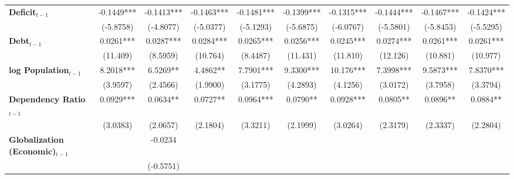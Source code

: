 \begin{center}
\begin{tabular}{lccccccccc}
\textbf{Deficit$_{t-1}$}             &     -0.1449***     &     -0.1413***     &     -0.1463***     &     -0.1481***     &     -0.1399***     &     -0.1315***     &     -0.1444***     &     -0.1467***     &     -0.1424***      \\
\textbf{ }                         &     (-5.8758)      &     (-4.8077)      &     (-5.0377)      &     (-5.1293)      &     (-5.6875)      &     (-6.0767)      &     (-5.5801)      &     (-5.8453)      &     (-5.5295)       \\
\textbf{Debt$_{t-1}$}                &     0.0261***      &     0.0287***      &     0.0284***      &     0.0265***      &     0.0256***      &     0.0245***      &     0.0274***      &     0.0261***      &     0.0261***       \\
\textbf{ }                         &      (11.409)      &      (8.5959)      &      (10.764)      &      (8.4487)      &      (11.431)      &      (11.810)      &      (12.126)      &      (10.881)      &      (10.977)       \\
\textbf{log Population$_{t-1}$}      &     8.2018***      &      6.5269**      &      4.4862**      &     7.7901***      &     9.3300***      &     10.176***      &     7.3998***      &     9.5873***      &     7.8370***       \\
\textbf{ }                         &      (3.9597)      &      (2.4566)      &      (1.9900)      &      (3.1775)      &      (4.2893)      &      (4.1256)      &      (3.0172)      &      (3.7958)      &      (3.3794)       \\
\textbf{Dependency Ratio$_{t-1}$}   &     0.0929***      &      0.0634**      &      0.0727**      &     0.0964***      &      0.0790**      &     0.0928***      &      0.0805**      &      0.0896**      &      0.0884**       \\
\textbf{ }                         &      (3.0383)      &      (2.0657)      &      (2.1804)      &      (3.3211)      &      (2.1999)      &      (3.0264)      &      (2.3179)      &      (2.3337)      &      (2.2804)       \\
\textbf{Globalization (Economic)$_{t-1}$}             &                    &      -0.0234       &                    &                    &                    &                    &                    &                    &                     \\
\textbf{ }                         &                    &     (-0.5751)      &                    &                    &                    &                    &                    &                    &                     \\

\end{tabular}
\end{center}
